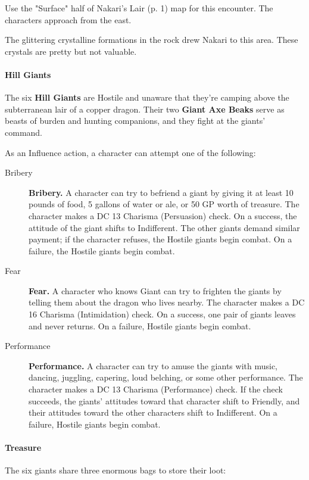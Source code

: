 \documentclass[letterpaper, 11pt, twocolumn]{dndbook}
\begin{document}
Use the "Surface" half of Nakari's Lair (p. 1) map for this encounter. The characters approach from the east.

The glittering crystalline formations in the rock drew Nakari to this area. These crystals are pretty but not valuable.

\paragraph{Hill Giants}

The six \textbf{Hill Giants} are Hostile and unaware that they're camping above the subterranean lair of a copper dragon. Their two \textbf{Giant Axe Beaks} serve as beasts of burden and hunting companions, and they fight at the giants' command.

As an Influence action, a character can attempt one of the following:

\begin{description}
\item[Bribery] \textbf{Bribery.} A character can try to befriend a giant by giving it at least 10 pounds of food, 5 gallons of water or ale, or 50 GP worth of treasure. The character makes a DC 13 Charisma (Persuasion) check. On a success, the attitude of the giant shifts to Indifferent. The other giants demand similar payment; if the character refuses, the Hostile giants begin combat. On a failure, the Hostile giants begin combat.
\item[Fear] \textbf{Fear.} A character who knows Giant can try to frighten the giants by telling them about the dragon who lives nearby. The character makes a DC 16 Charisma (Intimidation) check. On a success, one pair of giants leaves and never returns. On a failure, Hostile giants begin combat.
\item[Performance] \textbf{Performance.} A character can try to amuse the giants with music, dancing, juggling, capering, loud belching, or some other performance. The character makes a DC 13 Charisma (Performance) check. If the check succeeds, the giants' attitudes toward that character shift to Friendly, and their attitudes toward the other characters shift to Indifferent. On a failure, Hostile giants begin combat.
\end{description}

\paragraph{Treasure}

The six giants share three enormous bags to store their loot:
\end{document}
